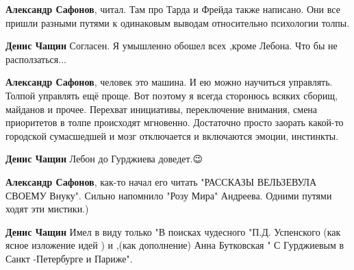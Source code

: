 \begin{itemize}
\begin{itemize}
\textbf{Александр Сафонов}, читал. Там про Тарда и Фрейда также написано. Они все пришли разными путями к одинаковым выводам относительно психологии толпы.

 
\textbf{Денис Чащин} Согласен. Я умышленно обошел всех ,кроме Лебона. Что бы не расползаться...

 
\textbf{Александр Сафонов}, человек это машина. И ею можно научиться управлять.
Толпой управлять ещё проще. Вот поэтому я всегда сторонюсь всяких сборищ,
майданов и прочее. Перехват инициативы, переключение внимания, смена
приоритетов в толпе происходят мгновенно. Достаточно просто заорать какой-то
городской сумасшедшей и мозг отключается и включаются эмоции, инстинкты.

 
\textbf{Денис Чащин} Лебон до Гурджиева доведет.😉

 
\textbf{Александр Сафонов}, как-то начал его читать "РАССКАЗЫ ВЕЛЬЗЕВУЛА СВОЕМУ
Внуку". Сильно напомнило "Розу Мира" Андреева. Одними путями ходят эти
мистики.)

 
\textbf{Денис Чащин} Имел в виду только "В поисках чудесного "П.Д. Успенского
(как ясное изложение идей ) и ,(как дополнение) Анна Бутковская " С Гурджиевым
в Санкт -Петербурге и Париже".
\end{itemize}


\end{itemize}
